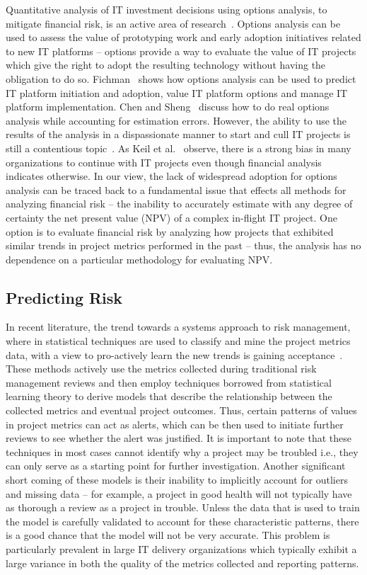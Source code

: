 Quantitative analysis of IT investment decisions using options analysis, to mitigate financial risk, is an active area of research~\cite{14,15,16}. Options analysis can be used to assess the value of prototyping work and early adoption initiatives related to new IT platforms – options provide a way to evaluate the value of IT projects which give the right to adopt the resulting technology without having the obligation to do so. Fichman~\cite{risk14} shows how options analysis can be used to predict IT platform initiation and adoption, value IT platform options and manage IT platform implementation. Chen and Sheng~\cite{risk15} discuss how to do real options analysis while accounting for estimation errors. However, the ability to use the results of the analysis in a dispassionate manner to start and cull IT projects is still a contentious topic~\cite{risk17}. As Keil et al.~\cite{risk18} observe, there is a strong bias in many organizations to continue with IT projects even though financial analysis indicates otherwise. In our view, the lack of widespread adoption for options analysis can be traced back to a fundamental issue that effects all methods for analyzing financial risk – the inability to accurately estimate with any degree of certainty the net present value (NPV) of a complex in-flight IT project. One option is to evaluate financial risk by analyzing how projects that exhibited similar trends in project metrics performed in the past -- thus, the analysis has no dependence on a particular methodology for evaluating NPV.

\subsection{Predicting Risk}

In recent literature, the trend towards a systems approach to risk management, where in statistical techniques are used to classify and mine the project metrics data, with a view to pro-actively learn the new trends is gaining acceptance~\cite{risk8,risk9,risk10}.  These methods actively use the metrics collected during traditional risk management reviews and then employ techniques borrowed from statistical learning theory to derive models that describe the relationship between the collected metrics and eventual project outcomes. Thus, certain patterns of values in project metrics can act as alerts, which can be then used to initiate further reviews to see whether the alert was justified. It is important to note that these techniques in most cases cannot identify why a project may be troubled i.e., they can only serve as a starting point for further investigation.  Another significant short coming of these models is their inability to implicitly account for outliers and missing data -- for example, a project in good health will not typically have as thorough a review as a project in trouble. Unless the data that is used to train the model is carefully validated to account for these characteristic patterns, there is a good chance that the model will not be very accurate. This problem is particularly prevalent in large IT delivery organizations which typically exhibit a large variance in both the quality of the metrics collected and reporting patterns.

